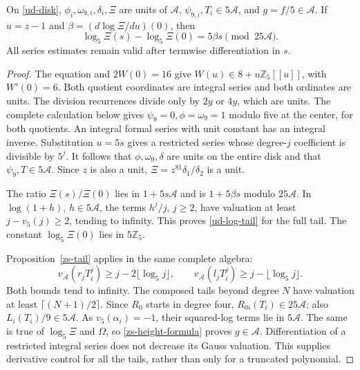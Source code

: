 \begin{lemma}
\label{ud-integral}
On \eqref{ud-disk}, \(\phi_i,\omega_{9,i},\delta_i,\Xi\) are units
of \(\mathcal A\), \(\psi_{9,i},T_i\in5\mathcal A\), and
\(g=f/5\in\mathcal A\). If \(u=z-1\) and
\(\beta=(d\log\Xi/du)(0)\), then
\begin{equation}
 \log_5\Xi(s)-\log_5\Xi(0)=5\beta s\pmod{25\mathcal A}.
 \label{ud-log-tail}
\end{equation}
All series estimates remain valid after termwise differentiation in
\(s\).
\end{lemma}
\begin{proof}
The equation and \(2W(0)=16\) give
\(W(u)\in8+u\mathbb Z_5[[u]]\), with \(W'(0)=6\).
Both quotient coordinates are integral series and both ordinates
are units. The division recurrences divide only by \(2y\) or
\(4y\), which are units. The complete calculation below gives
\(\psi_9=0,\phi=\omega_9=1\) modulo five at the center, for both
quotients. An integral formal series with unit constant has an
integral inverse. Substitution \(u=5s\) gives a restricted series
whose degree-\(j\) coefficient is divisible by \(5^j\). It follows
that \(\phi,\omega_9,\delta\) are units on the entire disk and that
\(\psi_9,T\in5\mathcal A\). Since \(z\) is also a unit,
\(\Xi=z^{81}\delta_1/\delta_2\) is a unit.

The ratio \(\Xi(s)/\Xi(0)\) lies in \(1+5s\mathcal A\) and is
\(1+5\beta s\) modulo \(25\mathcal A\). In \(\log(1+h)\),
\(h\in5\mathcal A\), the terms \(h^j/j\), \(j\ge2\), have
valuation at least \(j-v_5(j)\ge2\), tending to infinity.
This proves \eqref{ud-log-tail} for the full tail. The constant
\(\log_5\Xi(0)\) lies in \(5\mathbb Z_5\).

Proposition~\ref{zs-tail} applies in the same complete algebra:
\[
 v_{\mathcal A}(r_jT_i^j)\ge j-2\lfloor\log_5j\rfloor,\qquad
 v_{\mathcal A}(l_jT_i^j)\ge j-\lfloor\log_5j\rfloor.
\]
Both bounds tend to infinity. The composed tails beyond degree \(N\)
have valuation at least \(\lceil(N+1)/2\rceil\). Since \(R_0\)
starts in degree four, \(R_{0i}(T_i)\in25\mathcal A\);
also \(L_i(T_i)/9\in5\mathcal A\).
As \(v_5(\alpha_i)=-1\), their squared-log terms lie in
\(5\mathcal A\). The same is true of \(\log_5\Xi\) and \(\Omega\),
so \eqref{zs-height-formula} proves \(g\in\mathcal A\).
Differentiation of a restricted integral series does not decrease
its Gauss valuation. This supplies derivative control for all the
tails, rather than only for a truncated polynomial.
\end{proof}

